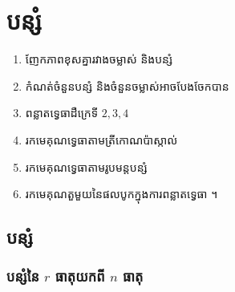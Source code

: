 \chapter{បន្សំ}

\begin{objBox}[វត្ថុបំណង]
\begin{enumerate}[1]
  \item ញែកភាពខុសគ្នារវាងចម្លាស់ និងបន្សំ
  \item កំណត់ចំនួនបន្សំ និងចំនួនចម្លាស់អាចបែងចែកបាន
  \item ពន្លាតទ្វេធាដឺក្រេទី $2, 3, 4$
  \item រកមេគុណទ្វេធាតាមត្រីកោណប៉ាស្កាល់
  \item រកមេគុណទ្វេធាតាមរូបមន្តបន្សំ
  \item រកមេគុណតួមួយនៃផលបូកក្នុងការពន្លាតទ្វេធា ។
\end{enumerate}
\end{objBox}

\section{បន្សំ}
\subsection{បន្សំនៃ \texorpdfstring{$r$}{r} ធាតុយកពី \texorpdfstring{$n$}{n} ធាតុ}

